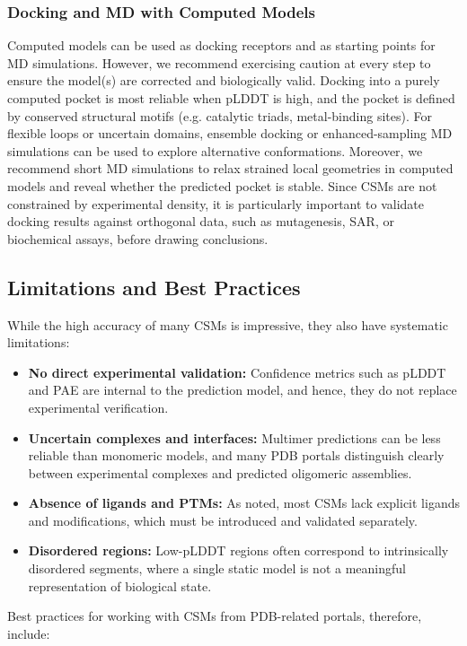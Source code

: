 \documentclass[12pt]{article}
\begin{document}
\subsubsection{Docking and MD with Computed Models}
Computed models can be used as docking receptors and as starting points for MD simulations. However, we recommend exercising caution at every step to ensure the model(s) are corrected and biologically valid. Docking into a purely computed pocket is most reliable when pLDDT is high, and the pocket is defined by conserved structural motifs (e.g. catalytic triads, metal-binding sites). For flexible loops or uncertain domains, ensemble docking or enhanced-sampling MD simulations can be used to explore alternative conformations. Moreover, we recommend short MD simulations to relax strained local geometries in computed models and reveal whether the predicted pocket is stable. Since CSMs are not constrained by experimental density, it is particularly important to validate docking results against orthogonal data, such as mutagenesis, SAR, or biochemical assays, before drawing conclusions.

\subsection{Limitations and Best Practices}
While the high accuracy of many CSMs is impressive, they also have systematic limitations:

\begin{itemize}
  \item \textbf{No direct experimental validation:} Confidence metrics such as pLDDT and PAE are internal to the prediction model, and hence, they do not replace experimental verification.
  \item \textbf{Uncertain complexes and interfaces:} Multimer predictions can be less reliable than monomeric models, and many PDB portals distinguish clearly between experimental complexes and predicted oligomeric assemblies.
  \item \textbf{Absence of ligands and PTMs:} As noted, most CSMs lack explicit ligands and modifications, which must be introduced and validated separately.
  \item \textbf{Disordered regions:} Low-pLDDT regions often correspond to intrinsically disordered segments, where a single static model is not a meaningful representation of biological state.
\end{itemize}

Best practices for working with CSMs from PDB-related portals, therefore, include:
\end{document}
